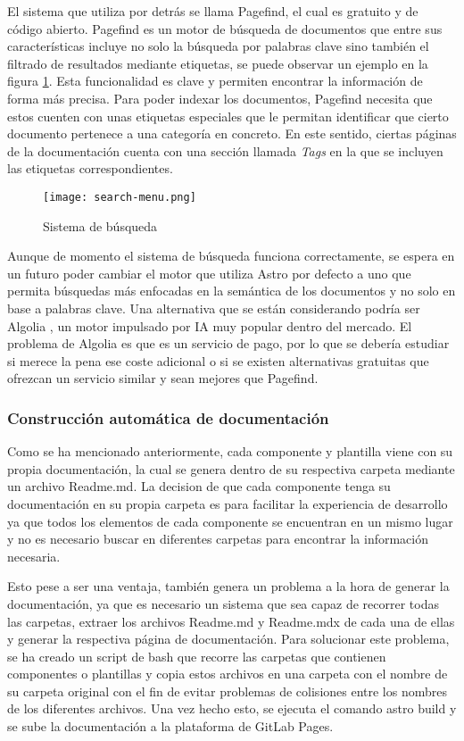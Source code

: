 El sistema que utiliza por detrás se llama Pagefind, el cual es gratuito 
y de código abierto. Pagefind es un motor de búsqueda de documentos
que entre sus características incluye no solo la búsqueda por palabras
clave sino también el filtrado de resultados mediante etiquetas, se puede observar
un ejemplo en la figura \ref{fig:search-menu}. Esta 
funcionalidad es clave y permiten encontrar la información de forma más precisa. 
Para poder indexar los documentos, Pagefind necesita que estos cuenten con
unas etiquetas especiales que le permitan identificar que cierto documento
pertenece a una categoría en concreto. En este sentido, ciertas páginas
de la documentación cuenta con una sección llamada \textit{Tags} en la que
se incluyen las etiquetas correspondientes.\medskip

\begin{figure}[ht]
    \centering
    \texttt{[image: search-menu.png]}
    \caption{Sistema de búsqueda}\label{fig:search-menu}
\end{figure}

Aunque de momento el sistema de búsqueda funciona correctamente, se
espera en un futuro poder cambiar el motor que utiliza Astro por defecto 
a uno que permita búsquedas más enfocadas en la semántica
de los documentos y no solo en base a palabras clave. Una alternativa que
se están considerando podría ser Algolia \cite{algoliaWhatAlgolia},
un motor impulsado por IA muy popular dentro del mercado. El
problema de Algolia es que es un servicio de pago, por lo que se
debería estudiar si merece la pena ese coste adicional o si se
existen alternativas gratuitas que ofrezcan un servicio similar y
sean mejores que Pagefind.

\subsubsection{Construcción automática de documentación}
Como se ha mencionado anteriormente, cada componente y plantilla 
viene con su propia documentación, la cual se genera dentro de su
respectiva carpeta mediante un archivo Readme.md. La decision de 
que cada componente tenga su documentación en su propia carpeta
es para facilitar la experiencia de desarrollo ya que todos los
elementos de cada componente se encuentran en un mismo lugar y no
es necesario buscar en diferentes carpetas para encontrar la
información necesaria.\medskip

Esto pese a ser una ventaja, también genera un problema a la hora de
generar la documentación, ya que es necesario un sistema que sea
capaz de recorrer todas las carpetas, extraer los archivos Readme.md
y Readme.mdx de cada una de ellas y generar la respectiva página
de documentación. Para solucionar este problema, se ha creado un
script de bash que recorre las carpetas que contienen componentes o
plantillas y copia estos archivos en una carpeta con el nombre de
su carpeta original con el fin de evitar problemas de colisiones
entre los nombres de los diferentes archivos. Una vez hecho esto,
se ejecuta el comando astro build y se sube la documentación a la
plataforma de GitLab Pages.

